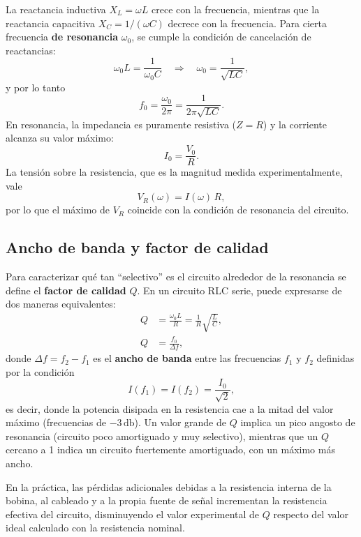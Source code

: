 \documentclass[a4paper,12pt]{article}
\begin{document}
La reactancia inductiva \( X_L = \omega L \) crece con la frecuencia, mientras que la reactancia capacitiva \( X_C = 1/(\omega C) \) decrece con la frecuencia. Para cierta frecuencia \textbf{de resonancia} \( \omega_0 \), se cumple la condición de cancelación de reactancias:
\[
\omega_0 L = \frac{1}{\omega_0 C}
\quad \Rightarrow \quad
\omega_0 = \frac{1}{\sqrt{LC}},
\]
y por lo tanto
\[
f_0 = \frac{\omega_0}{2\pi} = \frac{1}{2\pi\sqrt{LC}}.
\]
En resonancia, la impedancia es puramente resistiva (\( Z = R \)) y la corriente alcanza su valor máximo:
\[
I_0 = \frac{V_0}{R}.
\]
La tensión sobre la resistencia, que es la magnitud medida experimentalmente, vale
\[
V_R(\omega) = I(\omega)\,R,
\]
por lo que el máximo de \( V_R \) coincide con la condición de resonancia del circuito.

\subsection{Ancho de banda y factor de calidad}
Para caracterizar qué tan ``selectivo'' es el circuito alrededor de la resonancia se define el \textbf{factor de calidad} \( Q \). En un circuito RLC serie, puede expresarse de dos maneras equivalentes:
\begin{align}
Q &= \frac{\omega_0 L}{R} = \frac{1}{R}\sqrt{\frac{L}{C}}, \\
Q &= \frac{f_0}{\Delta f},
\end{align}
donde \( \Delta f = f_2 - f_1 \) es el \textbf{ancho de banda} entre las frecuencias \( f_1 \) y \( f_2 \) definidas por la condición
\[
I(f_1) = I(f_2) = \frac{I_0}{\sqrt{2}},
\]
es decir, donde la potencia disipada en la resistencia cae a la mitad del valor máximo (frecuencias de \(-3\,\si{\decibel}\)). Un valor grande de \( Q \) implica un pico angosto de resonancia (circuito poco amortiguado y muy selectivo), mientras que un \( Q \) cercano a 1 indica un circuito fuertemente amortiguado, con un máximo más ancho.

En la práctica, las pérdidas adicionales debidas a la resistencia interna de la bobina, al cableado y a la propia fuente de señal incrementan la resistencia efectiva del circuito, disminuyendo el valor experimental de \( Q \) respecto del valor ideal calculado con la resistencia nominal.

\end{document}
